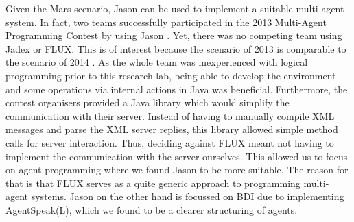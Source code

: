 Given the Mars scenario, Jason can be used to implement a suitable multi-agent system. In fact, two teams successfully participated in the 2013 Multi-Agent Programming Contest by using Jason \cite{ahlbrecht_multi_2013}. %
Yet, there was no competing team using Jadex or FLUX.
This is of interest because the scenario of 2013 is comparable to the scenario of 2014 \cite{ahlbrecht_mapc_2014}. %
As the whole team was inexperienced with logical programming prior to this research lab, being able to develop the environment and some operations via internal actions in Java was beneficial. Furthermore, the contest organisers provided a Java library which would simplify the communication with their server. Instead of having to manually compile XML messages and parse the XML server replies, this library allowed simple method calls for server interaction. Thus, deciding against FLUX meant not having to implement the communication with the server ourselves. This allowed us to focus on agent programming where we found Jason to be more suitable. The reason for that is that FLUX serves as a quite generic approach to programming multi-agent systems. Jason on the other hand is focussed on BDI due to implementing AgentSpeak(L), which we found to be a clearer structuring of agents.
